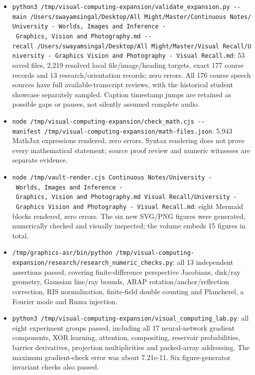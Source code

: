 \begin{itemize}
\tightlist
\item
  \texttt{python3\ /tmp/visual-computing-expansion/validate\_expansion.py\ -\/-main\ \textquotesingle{}/Users/swayamsingal/Desktop/All\ Might/Master/Continuous\ Notes/University\ -\ Worlds,\ Images\ and\ Inference\ -\ Graphics,\ Vision\ and\ Photography.md\textquotesingle{}\ -\/-recall\ \textquotesingle{}/Users/swayamsingal/Desktop/All\ Might/Master/Visual\ Recall/University\ -\ Graphics\ Vision\ and\ Photography\ -\ Visual\ Recall.md\textquotesingle{}}: 53 saved files, 2,219 resolved local file/image/heading targets, exact 177 course records and 13 research/orientation records; zero errors. All 176 course speech sources have full available-transcript reviews, with the historical student showcase separately sampled. Caption timestamp jumps are retained as possible gaps or pauses, not silently assumed complete audio.
\item
  \texttt{node\ /tmp/visual-computing-expansion/check\_math.cjs\ -\/-manifest\ /tmp/visual-computing-expansion/math-files.json}: 5,943 MathJax expressions rendered, zero errors. Syntax rendering does not prove every mathematical statement; source proof review and numeric witnesses are separate evidence.
\item
  \texttt{node\ /tmp/vault-render.cjs\ \textquotesingle{}Continuous\ Notes/University\ -\ Worlds,\ Images\ and\ Inference\ -\ Graphics,\ Vision\ and\ Photography.md\textquotesingle{}\ \textquotesingle{}Visual\ Recall/University\ -\ Graphics\ Vision\ and\ Photography\ -\ Visual\ Recall.md\textquotesingle{}}: eight Mermaid blocks rendered, zero errors. The six new SVG/PNG figures were generated, numerically checked and visually inspected; the volume embeds 15 figures in total.
\item
  \texttt{/tmp/graphics-asr/bin/python\ /tmp/visual-computing-expansion/research/research\_numeric\_checks.py}: all 13 independent assertions passed, covering finite-difference perspective Jacobians, disk/ray geometry, Gaussian line/ray bounds, ARAP rotation/anchor/reflection correction, RIS normalization, finite-field double counting and Plancherel, a Fourier mode and Ruzsa injection.
\item
  \texttt{python3\ /tmp/visual-computing-expansion/visual\_computing\_lab.py}: all eight experiment groups passed, including all 17 neural-network gradient components, XOR learning, attention, compositing, reservoir probabilities, barrier derivatives, projection multiplicities and packed-array addressing. The maximum gradient-check error was about 7.21e-11. Six figure-generator invariant checks also passed.

\end{itemize}
